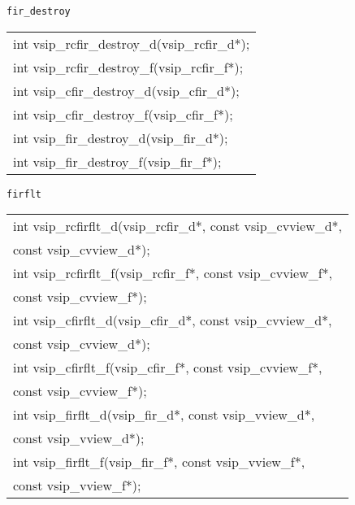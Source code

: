 \newline \hspace*{.8cm} \vspace*{.1cm} \texttt{fir\_destroy}
\newline \hspace*{1.1cm} {
\ttfamily
\begin{tabular}[H]{l}
int vsip\_rcfir\_destroy\_d(vsip\_rcfir\_d*);\\
int vsip\_rcfir\_destroy\_f(vsip\_rcfir\_f*);\\
int vsip\_cfir\_destroy\_d(vsip\_cfir\_d*);\\
int vsip\_cfir\_destroy\_f(vsip\_cfir\_f*);\\
int vsip\_fir\_destroy\_d(vsip\_fir\_d*);\\
int vsip\_fir\_destroy\_f(vsip\_fir\_f*);\\
\end{tabular}
}\vspace{.1cm}
\newline \hspace*{.8cm} \vspace*{.1cm} \texttt{firflt}
\newline \hspace*{1.1cm} {
\ttfamily
\begin{tabular}[H]{l}
int vsip\_rcfirflt\_d(vsip\_rcfir\_d*, const vsip\_cvview\_d*,\\*\hspace{.7cm}const vsip\_cvview\_d*);\\
int vsip\_rcfirflt\_f(vsip\_rcfir\_f*, const vsip\_cvview\_f*,\\*\hspace{.7cm}const vsip\_cvview\_f*);\\
int vsip\_cfirflt\_d(vsip\_cfir\_d*, const vsip\_cvview\_d*,\\*\hspace{.7cm}const vsip\_cvview\_d*);\\
int vsip\_cfirflt\_f(vsip\_cfir\_f*, const vsip\_cvview\_f*,\\*\hspace{.7cm}const vsip\_cvview\_f*);\\
int vsip\_firflt\_d(vsip\_fir\_d*, const vsip\_vview\_d*,\\*\hspace{.7cm}const vsip\_vview\_d*);\\
int vsip\_firflt\_f(vsip\_fir\_f*, const vsip\_vview\_f*,\\*\hspace{.7cm}const vsip\_vview\_f*);\\
\end{tabular}
}

